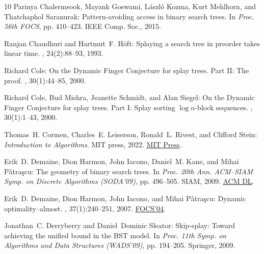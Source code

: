\begin{thebibliography}{10}
{\sc Parinya Chalermsook, Mayank Goswami, L{\'{a}}szl{\'{o}} Kozma, Kurt
  Mehlhorn, and Thatchaphol Saranurak}: Pattern-avoiding access in binary
  search trees.
\newblock In {\em Proc. 56th FOCS}, pp. 410--423. IEEE Comp. Soc., 2015.

{\sc Ranjan Chaudhuri and Hartmut~F. H\"{o}ft}: Splaying a search tree in
  preorder takes linear time.
, 24(2):88--93, 1993.
\newblock [\epfmtdoi{10.1145/156063.156067}]

{\sc Richard Cole}: {On the Dynamic Finger Conjecture for splay trees. Part II:
  The proof}.
, 30(1):44--85, 2000.
\newblock [\epfmtdoi{10.1137/S009753979732699X}]

{\sc Richard Cole, Bud Mishra, Jeanette Schmidt, and Alan Siegel}: {On the
  Dynamic Finger Conjecture for splay trees. Part I: Splay} sorting $\log
  n$-block sequences.
, 30(1):1--43, 2000.
\newblock [\epfmtdoi{10.1137/S0097539797326988}]

{\sc Thomas~H. Cormen, Charles~E. Leiserson, Ronald~L. Rivest, and Clifford
  Stein}: {\em Introduction to Algorithms}.
\newblock MIT press, 2022.
\newblock
  \href{http://mitpress.mit.edu/9780262046305/introduction-to-algorithms}{MIT
  Press}.

{\sc Erik~D. Demaine, Dion Harmon, John Iacono, Daniel~M. Kane, and Mihai
  {P\v{a}tra\c{s}cu}}: The geometry of binary search trees.
\newblock In {\em Proc. 20th Ann. ACM--SIAM Symp. on Discrete Algorithms
  (SODA'09)}, pp. 496--505. SIAM, 2009.
\newblock \href{https://dl.acm.org/doi/10.5555/1496770.1496825}{ACM DL}.

{\sc Erik~D. Demaine, Dion Harmon, John Iacono, and Mihai {P\v{a}tra\c{s}cu}}:
  Dynamic optimality--almost.
, 37(1):240--251, 2007.
\newblock \prelim \href{https://doi.org/10.1109/FOCS.2004.23}{FOCS'04}.
\newblock [\epfmtdoi{10.1137/S0097539705447347}]

{\sc Jonathan~C. Derryberry and Daniel~Dominic Sleator}: Skip-splay: {T}oward
  achieving the unified bound in the {BST} model.
\newblock In {\em Proc. 11th Symp. on Algorithms and Data Structures
  (WADS'09)}, pp. 194--205. Springer, 2009.
\newblock [\epfmtdoi{10.1007/978-3-642-03367-4\_18}]


\end{thebibliography}
